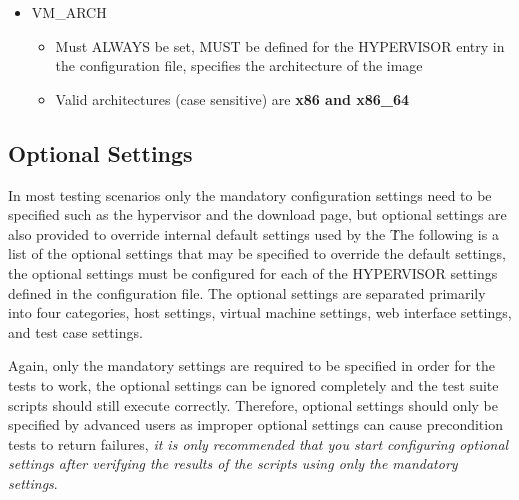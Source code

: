 \begin{itemize}
\item	VM\_ARCH
		\begin{itemize}
		\item	Must ALWAYS be set, MUST be defined for the HYPERVISOR entry in the configuration
				file, specifies the architecture of the \cernvm image
		\item	Valid architectures (case sensitive) are {\bf x86 and x86\_64}
		\end{itemize}


\end{itemize}




\subsection{Optional Settings}
\label{sct:optionalsettings}

In most testing scenarios only the mandatory configuration settings need to be specified such as the hypervisor and 
the download page, but optional settings are also provided to override internal default settings used by the 
\cernvmtestframework\. The following is a list of the optional settings that may be specified to override the default
settings, the optional settings must be configured for each of the HYPERVISOR settings defined in the configuration file.
The optional settings are separated primarily into four categories, host settings, virtual machine settings, web interface
settings, and test case settings. 

Again, only the mandatory settings are required to be specified in order for the tests to work, the optional settings 
can be ignored completely and the test suite scripts should still execute correctly. Therefore, optional settings should
only be specified by advanced users as improper optional settings can cause precondition tests to return failures,
\emph{it is only recommended that you start configuring optional settings after verifying the results of the scripts 
using only the mandatory settings}.


